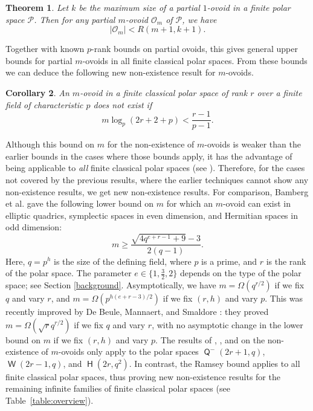 \documentclass[a4paper,11pt]{amsproc}
\theoremstyle{plain}
\newtheorem{Theorem} {Theorem} [section]
\newtheorem{Corollary} [Theorem] {Corollary}
\theoremstyle{definition}
\newcommand{\<}{\langle}
\renewcommand{\>}{\rangle} %
\DeclareMathOperator\h{\mathsf{H}}
\DeclareMathOperator\w{\mathsf{W}}
\DeclareMathOperator\q{\mathsf{Q}}
\begin{document}
\begin{Theorem}\label{Ramseypartialmovoid}
Let $k$ be the maximum size of a partial $1$-ovoid in a finite polar space $\mathcal{P}$. 
Then for any partial $m$-ovoid $\mathcal{O}_m$ of $\mathcal{P}$, we have 
\[
|\mathcal{O}_m| < R(m+1,k+1).
\]
\end{Theorem}

Together with known $p$-rank bounds on partial ovoids, this gives general upper bounds for partial $m$-ovoids in all finite classical polar spaces. 
From these bounds we can deduce the following new non-existence result for $m$-ovoids.

\begin{Corollary}\label{Ramseypartialmovoid_corollary}
    An $m$-ovoid in a finite classical polar space of rank $r$ over a finite field of characteristic $p$ does not exist if 
    \[
m \log_p(2r+2+p) < \frac{r-1}{p-1}.
\]
\end{Corollary}
Although this bound on $m$ for the non-existence of $m$-ovoids is weaker than the earlier bounds in the cases where those bounds apply, it has the advantage of being applicable to \textit{all} finite classical polar spaces (see \cite{BKLP2007}).
Therefore, for the cases not covered by the previous results, where the earlier techniques cannot show any non-existence results, we get new non-existence results.
For comparison, Bamberg et al. \cite{BKLP2007} gave the following lower bound on $m$ for which an $m$-ovoid can exist in elliptic quadrics, symplectic spaces in even dimension, and Hermitian spaces in odd dimension:
\[
m\ge \frac{\sqrt{4 q^{e+r-1}+9}-3}{2 (q-1)}.
\]
Here, $q=p^h$ is the size of the defining field, where $p$ is a prime, and $r$ is the rank of the polar space.
The parameter $e\in\{1,\frac{3}{2},2\}$ depends on the type of the polar space; see Section \ref{background}. 
Asymptotically, we have $m=\Omega(q^{r/2})$ if we fix $q$ and vary $r$, and $m=\Omega\left(p^{h(e+r-3)/2}\right)$ if we fix $(r,h)$ and vary $p$. 
This was recently improved by De Beule, Mannaert, and Smaldore \cite{DeBMS}: they proved $m=\Omega( \sqrt{r} q^{r/2})$ if we fix $q$ and vary $r$, with no asymptotic change in the lower bound on $m$ if we fix $(r,h)$ and vary $p$. 
The results of \cite{BKLP2007}, \cite{DeBMS}, and \cite{HamiltonMathon} on the non-existence of $m$-ovoids only apply to the polar spaces $\q^-(2r+1,q)$, $\w(2r-1,q)$, and $\h(2r,q^2)$. 
In contrast, the Ramsey bound applies to all finite classical polar spaces, thus proving new non-existence results for the remaining infinite families of finite classical polar spaces (see Table~\ref{table:overview}).
\end{document}
